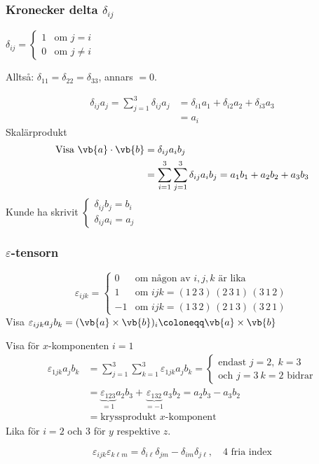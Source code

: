 \subsubsection*{Kronecker delta $\delta_{ij}$}
\begin{definition}
$\delta_{ij} = \begin{cases} 1 & \text{om } j = i \\ 0 & \text{om } j \neq i \end{cases}$
\end{definition}
Alltså: $\delta_{11} = \delta_{22} = \delta_{33}$, annars $= 0$.

\begin{example}
\begin{align*}
\delta_{ij} a_j = \sum_{j=1}^3 \delta_{ij} a_j &= \delta_{i1} a_1 + \delta_{i2} a_2 + \delta_{i3} a_3 \\
&= a_i
\end{align*}
Skalärprodukt
\begin{align*}
\text{Visa } \vb{a} \cdot \vb{b} &= \delta_{ij} a_i b_j \\
&= \sum_{i=1}^3 \sum_{j=1}^3 \delta_{ij} a_i b_j = a_1 b_1 + a_2 b_2 + a_3 b_3
\end{align*}
Kunde ha skrivit $\begin{cases} \delta_{ij} b_j = b_i \\ \delta_{ij} a_i = a_j \end{cases}$
\end{example}

\subsubsection*{$\varepsilon$-tensorn}
\[ \varepsilon_{ijk} = \begin{cases} 0 & \text{om någon av } i, j, k \text{ är lika} \\ 1 & \text{om } ijk = (1\,2\,3)\,(2\,3\,1)\,(3\,1\,2) \\ -1 & \text{om } ijk = (1\,3\,2)\,(2\,1\,3)\,(3\,2\,1) \end{cases} \]
Visa $\varepsilon_{ijk} a_j b_k = (\vb{a} \times \vb{b})_i \coloneqq \vb{a} \times \vb{b}$

Visa för $x$-komponenten $i = 1$
\begin{align*}
\varepsilon_{1jk} a_j b_k &= \sum_{j=1}^3 \sum_{k=1}^3 \varepsilon_{1jk} a_j b_k = \begin{cases} \text{endast } j = 2,\ k = 3 \\ \text{och } j = 3\ k = 2 \text{ bidrar} \end{cases} \\
&= \underbrace{\varepsilon_{123}}_{=1} a_2 b_3 + \underbrace{\varepsilon_{132}}_{=-1} a_3 b_2 = a_2 b_3 - a_3 b_2 \\
&= \text{kryssprodukt } x\text{-komponent}
\end{align*}
Lika för $i = 2$ och $3$ för $y$ respektive $z$.

\[ \varepsilon_{ijk}\varepsilon_{k\ell m} = \delta_{i\ell}\delta_{jm} - \delta_{im}\delta_{j\ell}, \quad 4 \text{ fria index} \]
